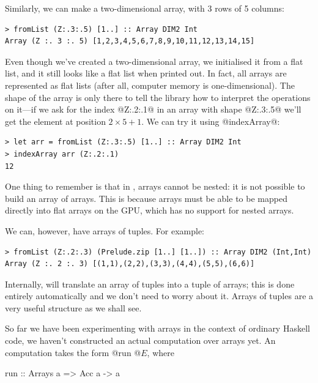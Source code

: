 Similarly, we can make a two-dimensional array, with 3 rows of 5
columns:

\begin{verbatim}
> fromList (Z:.3:.5) [1..] :: Array DIM2 Int
Array (Z :. 3 :. 5) [1,2,3,4,5,6,7,8,9,10,11,12,13,14,15]
\end{verbatim}

\noindent Even though we've created a two-dimensional array, we
initialised it from a flat list, and it still looks like a flat list
when printed out.  In fact, all arrays are represented as flat lists
(after all, computer memory is one-dimensional).  The shape of the
array is only there to tell the library how to interpret the
operations on it---if we ask for the index @Z:.2:.1@ in an array with
shape @Z:.3:.5@ we'll get the element at position $2 \times 5 + 1$.
We can try it using @indexArray@:

\begin{verbatim}
> let arr = fromList (Z:.3:.5) [1..] :: Array DIM2 Int
> indexArray arr (Z:.2:.1)
12
\end{verbatim}

One thing to remember is that in \acc{}, arrays cannot be nested: it is
not possible to build an array of arrays.  This is because arrays must
be able to be mapped directly into flat arrays on the GPU, which has
no support for nested arrays.

We can, however, have arrays of tuples.  For example:

\begin{verbatim}
> fromList (Z:.2:.3) (Prelude.zip [1..] [1..]) :: Array DIM2 (Int,Int)
Array (Z :. 2 :. 3) [(1,1),(2,2),(3,3),(4,4),(5,5),(6,6)]
\end{verbatim}

Internally, \acc{} will translate an array of tuples into a tuple of
arrays; this is done entirely automatically and we don't need to worry
about it.  Arrays of tuples are a very useful structure as we shall
see.


So far we have been experimenting with arrays in the context of
ordinary Haskell code, we haven't constructed an actual \acc{}
computation over arrays yet.  An \acc{} computation takes the form
@run @$E$, where

\begin{haskell}
run :: Arrays a => Acc a -> a
\end{haskell}

